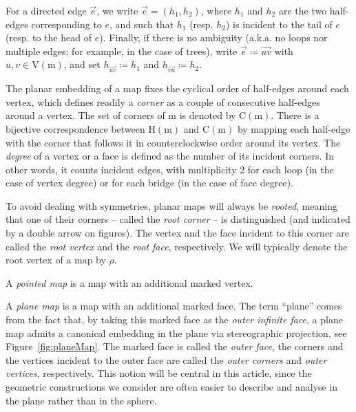 \documentclass[11pt,reqno,tbtags]{amsart}
\renewcommand{\rm}{\mathrm{m}}
\numberwithin{equation}{section}
\numberwithin{theo}{section}
\theoremstyle{definition}
\begin{document}
For a directed edge $\overrightarrow{e}$, we write $\overrightarrow{e}=(h_1,h_2)$, where $h_1$ and $h_2$ are the two half-edges corresponding to $e$, and such that $h_1$ (resp. $h_2$) is incident to the tail of $e$ (resp. to the head of $e$). Finally, if there is no ambiguity (a.k.a. no loops nor multiple edges; for example, in the case of trees), write $\overrightarrow{e}\coloneqq\overrightarrow{uv}$ with $u,v\in \mathrm{V}(\rm)$, and set $h_{\overrightarrow{uv}}\coloneqq h_1$ and $h_{\overrightarrow{vu}}\coloneqq h_2$.

The planar embedding of a map fixes the cyclical order of half-edges around each vertex, which
defines readily a \emph{corner} as a couple of consecutive half-edges
around a vertex. The set of corners of $\rm$ is denoted by $\mathrm{C}(\rm)$.  There is a bijective correspondence between $\mathrm{H}(\rm)$ and $\mathrm{C}(\rm)$ by mapping each half-edge with the corner that follows it in counterclockwise order around its vertex. 
The \emph{degree}
of a vertex or a face is defined as the number of its incident corners. In
other words, it counts incident edges, with multiplicity 2 for each
loop (in the case of vertex degree) or for each bridge (in the case of
face degree).

\smallskip

To avoid dealing with symmetries, planar maps will always be \emph{rooted}, meaning that one of their corners -- called the \emph{root corner} -- is distinguished (and indicated by a double arrow on figures). The vertex and the face incident to this corner are called the \emph{root vertex} and the \emph{root face}, respectively. We will typically denote the root vertex of a map by $\rho$.

A \emph{pointed map} is a map with an additional marked vertex. \medskip


A \emph{plane map} is a map with an additional marked face. The term ``plane'' comes from the fact that, by taking this marked face as the \emph{outer infinite face}, a plane map admits a canonical embedding in the plane via stereographic projection, see Figure~\ref{fig:planeMap}. The marked face is called the \emph{outer face}, the corners and the vertices incident to the outer face are called the \emph{outer corners} and \emph{outer vertices}, respectively. This notion will be central in this article, since the geometric constructions we consider are often easier to describe and analyse in the plane rather than in the sphere. 
\end{document}
